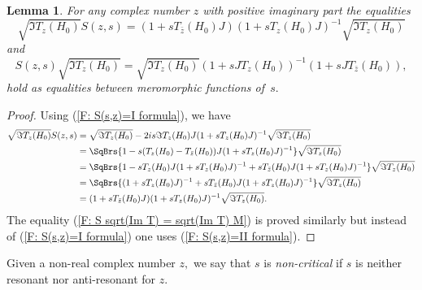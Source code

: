 \documentclass[11pt]{amsart}
\newtheorem{lemma}[thm]{Lemma}
\numberwithin{equation}{section}
\begin{document}
\begin{lemma} For any complex number $z$ with positive imaginary part the equalities
\begin{equation} \label{F: sqrt(Im T) S = M sqrt(Im T)}
    \sqrt{\Im T_{z}(H_0)} S(z,s) = (1+s T_{\bar z}(H_0)J)(1+s T_{z}(H_0)J)^{-1}\sqrt{\Im T_{z}(H_0)}
\end{equation}
and
\begin{equation} \label{F: S sqrt(Im T) = sqrt(Im T) M}
    S(z,s) \sqrt{\Im T_{z}(H_0)} = \sqrt{\Im T_{z}(H_0)} (1+s J T_z(H_0))^{-1}(1+s J T_{\bar z}(H_0)),
\end{equation}
hold as equalities between meromorphic functions of~$s.$
\end{lemma}
\begin{proof} Using (\ref{F: S(s,z)=I formula}), we have
\begin{equation*}
  \begin{split}
    \sqrt{\Im T_{z}(H_0)} S(z,s) & = \sqrt{\Im T_{z}(H_0)} - 2i s\Im T_{z}(H_0) J (1+sT_{z}(H_0)J)^{-1}\sqrt{\Im T_{z}(H_0)}
    \\ & = \SqBrs{1 - s(T_{z}(H_0) -T_{\bar z}(H_0))J (1+sT_{z}(H_0)J)^{-1}}\sqrt{\Im T_{z}(H_0)}
    \\ & = \SqBrs{1 - sT_{z}(H_0)J(1+sT_{z}(H_0)J)^{-1} + sT_{\bar z}(H_0)J (1+sT_{z}(H_0)J)^{-1}}\sqrt{\Im T_{z}(H_0)}
    \\ & = \SqBrs{(1+sT_{z}(H_0)J)^{-1} + sT_{\bar z}(H_0)J (1+sT_{z}(H_0)J)^{-1}}\sqrt{\Im T_{z}(H_0)}
    \\ & =  (1 + sT_{\bar z}(H_0)J) (1+sT_{z}(H_0)J)^{-1}\sqrt{\Im T_{z}(H_0)}.
  \end{split}
\end{equation*}
The equality (\ref{F: S sqrt(Im T) = sqrt(Im T) M}) is proved similarly but instead of (\ref{F: S(s,z)=I formula})
one uses (\ref{F: S(s,z)=II formula}).
\end{proof}

Given a non-real complex number $z,$ we say that $s$ is \emph{non-critical} if $s$ is neither resonant nor anti-resonant for $z.$
\end{document}

